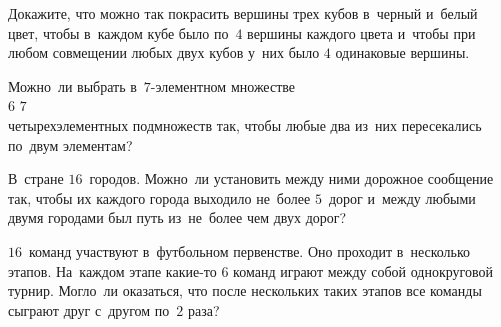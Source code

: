 \begin{problems}

\item
Докажите, что можно так покрасить вершины трех кубов в~черный и~белый цвет,
чтобы в~каждом кубе было по~$4$ вершины каждого цвета и~чтобы при любом
совмещении любых двух кубов у~них было $4$ одинаковые вершины.

\item
Можно~ли выбрать в~$7$-элементном множестве
\\
\subproblem $6$
\quad
\subproblem $7$
\\
четырехэлементных подмножеств так, чтобы любые два из~них пересекались по~двум
элементам?

\item
В~стране $16$~городов.
Можно~ли установить между ними дорожное сообщение так, чтобы их каждого города
выходило не~более $5$~дорог и~между любыми двумя городами был путь из~не~более
чем двух дорог?

\item
$16$~команд участвуют в~футбольном первенстве.
Оно проходит в~несколько этапов.
На~каждом этапе какие-то 6 команд играют между собой однокруговой турнир.
Могло~ли оказаться, что после нескольких таких этапов все команды сыграют друг
с~другом по~$2$ раза?

\end{problems}

